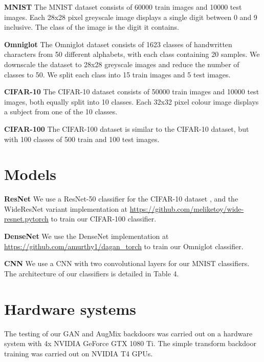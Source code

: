 \documentclass{article}
\begin{document}
\textbf{MNIST} The MNIST dataset \citep{mnist} consists of 60000 train images and 10000 test images. Each 28x28 pixel greyscale image displays a single digit between 0 and 9 inclusive. The class of the image is the digit it contains.

\textbf{Omniglot} The Omniglot dataset \citep{omniglot} consists of 1623 classes of handwritten characters from 50 different alphabets, with each class containing 20 samples. We downscale the dataset to 28x28 greyscale images and reduce the number of classes to 50. We split each class into 15 train images and 5 test images.

\textbf{CIFAR-10} The CIFAR-10 dataset \citep{cifar} consists of 50000 train images and 10000 test images, both equally split into 10 classes. Each 32x32 pixel colour image displays a subject from one of the 10 classes.

\textbf{CIFAR-100} The CIFAR-100 dataset \citep{cifar} is similar to the CIFAR-10 dataset, but with 100 classes of 500 train and 100 test images.

\section{Models}

\textbf{ResNet} We use a ResNet-50 classifier for the CIFAR-10 dataset \citep{resnet}, and the WideResNet variant implementation at \href{https://github.com/meliketoy/wide-resnet.pytorch}{https://github.com/meliketoy/wide-resnet.pytorch} to train our CIFAR-100 classifier.

\textbf{DenseNet} We use the DenseNet \citep{densenet} implementation at \href{https://github.com/amurthy1/dagan\_torch}{https://github.com/amurthy1/dagan\_torch} to train our Omniglot classifier.

\textbf{CNN} We use a CNN with two convolutional layers for our MNIST classifiers. The architecture of our classifiers is detailed in Table 4.

\section{Hardware systems}

The testing of our GAN and AugMix backdoors was carried out on a hardware system with 4x NVIDIA GeForce GTX 1080 Ti. The simple transform backdoor training was carried out on NVIDIA T4 GPUs.

\makeatletter
\setlength{\@fptop}{0pt}
\makeatother
\end{document}

